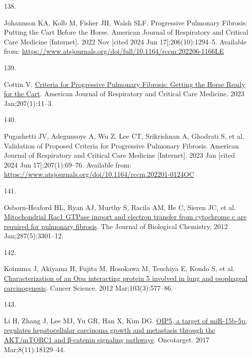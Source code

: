 \documentclass[
]{article}
\newlength{\cslhangindent}
\newlength{\csllabelwidth}
\newenvironment{CSLReferences}[2] %
 {\begin{list}{}{%
  \setlength{\itemindent}{0pt}
  \setlength{\leftmargin}{0pt}
  \setlength{\parsep}{0pt}
  \ifodd #1
   \setlength{\leftmargin}{\cslhangindent}
   \setlength{\itemindent}{-1\cslhangindent}
  \fi
  \setlength{\itemsep}{#2\baselineskip}}}
 {\end{list}}
\newcommand{\CSLLeftMargin}[1]{\parbox[t]{\csllabelwidth}{\strut#1\strut}}
\newcommand{\CSLRightInline}[1]{\parbox[t]{\linewidth - \csllabelwidth}{\strut#1\strut}}
\begin{document}
\begin{CSLReferences}{0}{1}
\CSLLeftMargin{138. }%
\CSLRightInline{Johannson KA, Kolb M, Fisher JH, Walsh SLF. Progressive {Pulmonary} {Fibrosis}: {Putting} the {Cart} {Before} the {Horse}. American Journal of Respiratory and Critical Care Medicine {[}Internet{]}. 2022 Nov {[}cited 2024 Jun 17{]};206(10):1294--5. Available from: \url{https://www.atsjournals.org/doi/full/10.1164/rccm.202206-1166LE}}

\CSLLeftMargin{139. }%
\CSLRightInline{Cottin V. \href{https://doi.org/10.1164/rccm.202208-1639ED}{Criteria for {Progressive} {Pulmonary} {Fibrosis}: {Getting} the {Horse} {Ready} for the {Cart}}. American Journal of Respiratory and Critical Care Medicine. 2023 Jan;207(1):11--3. }

\CSLLeftMargin{140. }%
\CSLRightInline{Pugashetti JV, Adegunsoye A, Wu Z, Lee CT, Srikrishnan A, Ghodrati S, et al. Validation of {Proposed} {Criteria} for {Progressive} {Pulmonary} {Fibrosis}. American Journal of Respiratory and Critical Care Medicine {[}Internet{]}. 2023 Jan {[}cited 2024 Jun 17{]};207(1):69--76. Available from: \url{https://www.atsjournals.org/doi/10.1164/rccm.202201-0124OC}}

\CSLLeftMargin{141. }%
\CSLRightInline{Osborn-Heaford HL, Ryan AJ, Murthy S, Racila AM, He C, Sieren JC, et al. \href{https://doi.org/10.1074/jbc.M111.308387}{Mitochondrial {Rac1} {GTPase} import and electron transfer from cytochrome c are required for pulmonary fibrosis}. The Journal of Biological Chemistry. 2012 Jan;287(5):3301--12. }

\CSLLeftMargin{142. }%
\CSLRightInline{Koinuma J, Akiyama H, Fujita M, Hosokawa M, Tsuchiya E, Kondo S, et al. \href{https://doi.org/10.1111/j.1349-7006.2011.02167.x}{Characterization of an {Opa} interacting protein 5 involved in lung and esophageal carcinogenesis}. Cancer Science. 2012 Mar;103(3):577--86. }

\CSLLeftMargin{143. }%
\CSLRightInline{Li H, Zhang J, Lee MJ, Yu GR, Han X, Kim DG. \href{https://doi.org/10.18632/oncotarget.15185}{{OIP5}, a target of {miR}-15b-5p, regulates hepatocellular carcinoma growth and metastasis through the {AKT}/{mTORC1} and β-catenin signaling pathways}. Oncotarget. 2017 Mar;8(11):18129--44. }


\end{CSLReferences}
\end{document}
